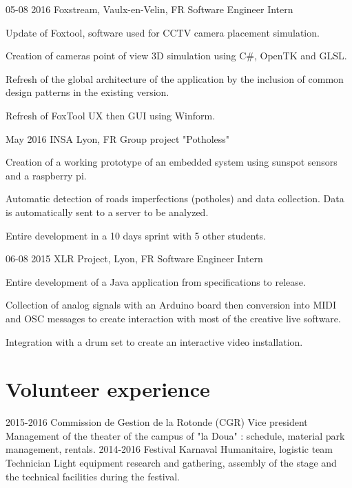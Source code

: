 \documentclass[a4paper]{friggeri-cv}
\begin{document}
\begin{entrylist}
\entry
{05-08 2016}
{Foxstream, Vaulx-en-Velin, FR}
{Software Engineer Intern}
{\begin{myitemize}
\vspace{-12pt}
\item Update of Foxtool, software used for CCTV camera placement simulation.
\item Creation of cameras point of view 3D simulation using C\#, OpenTK and GLSL.
\item Refresh of the global architecture of the application by the inclusion of common design patterns in the existing version.
\item Refresh of FoxTool UX then GUI using Winform.
\end{myitemize}
}
\entry
{May 2016}
{INSA Lyon, FR}
{Group project "Potholess"}
{\begin{myitemize}
\vspace{-12pt}
\item Creation of a working prototype of an embedded system using sunspot sensors and a raspberry pi.
\item Automatic detection of roads imperfections (potholes) and data collection. Data is automatically sent to a server to be analyzed.
\item Entire development in a 10 days sprint with 5 other students.
\end{myitemize}
}
  \entry
    {06-08 2015}
    {XLR Project, Lyon, FR}
    {Software Engineer Intern}
	{\begin{myitemize}
\vspace{-12pt}
\item Entire development of a Java application from specifications to release.
\item Collection of analog signals with an Arduino board then conversion into MIDI and OSC messages to create interaction with most of the creative live software.
\item Integration with a drum set to create an interactive video installation.
\end{myitemize}    
}

\end{entrylist}

\section{Volunteer experience}
\begin{entrylist}
	\entry
	{2015-2016}
	{Commission de Gestion de la Rotonde (CGR)}
	{Vice president}
	{Management of the theater of the campus of "la Doua" : schedule, material park management, rentals.}
	\entry
	{2014-2016}
	{Festival Karnaval Humanitaire, logistic team}
	{Technician}
	{Light equipment research and gathering, assembly of the stage and the technical facilities during the festival.}
	\end{entrylist}
	
\end{document}
